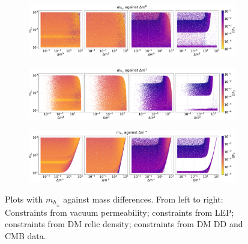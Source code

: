 \documentclass[12pt]{article}
\begin{document}
\begin{figure}[H]
    \begin{subfigure}[b]{\columnwidth}
      \centering
      \includegraphics[width=1\columnwidth]{4plot/MDP_DM2.pdf}
    \end{subfigure}
    
    \begin{subfigure}[b]{\columnwidth}
      \centering
      \includegraphics[width=1\columnwidth]{4plot/MDP_DM3.pdf}
    \end{subfigure}

    \begin{subfigure}[b]{\columnwidth}
      \centering
      \includegraphics[width=1\columnwidth]{4plot/MDP_DMP.pdf}
    \end{subfigure}
    \caption{Plots with $m_{h_\pm}$ against mass differences. From left to right: Constraints from vacuum permeability; constraints from LEP; constraints from DM relic density; constraints from DM DD and CMB data.}
\end{figure}
\end{document}
